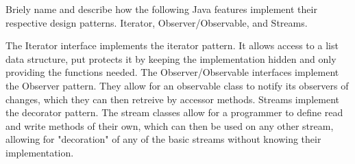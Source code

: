 Briely name and describe how the following Java features implement their respective design patterns.  Iterator, Observer/Observable, and Streams.

\begin{answer}
The Iterator interface implements the iterator pattern. It allows access to a list data structure, put protects it by keeping the implementation hidden and only providing the functions needed.
The Observer/Observable interfaces implement the Observer pattern.  They allow for an observable class to notify its observers of changes, which they can then retreive by accessor methods.
Streams implement the decorator pattern.  The stream classes allow for a programmer to define read and write methods of their own, which can then be used on any other stream, allowing for "decoration" of any of the basic streams without knowing their implementation.
\end{answer}
